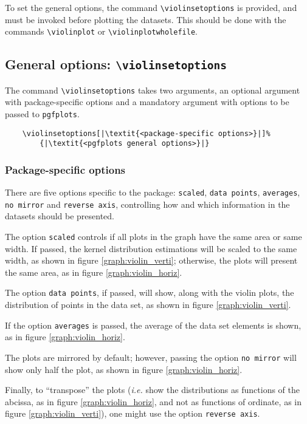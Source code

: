 \documentclass{article}
\begin{document}
To set the general options, the command \texttt{{\textbackslash}violinsetoptions}
is provided, and must be invoked before plotting the datasets. This should
be done with the commands \texttt{{\textbackslash}violinplot} or
\texttt{{\textbackslash}violinplotwholefile}.

\subsection{General options: \texttt{{\textbackslash}violinsetoptions}}

The command \texttt{{\textbackslash}violinsetoptions} takes two arguments,
an optional argument with package-specific options and a mandatory
argument with options to be passed to \texttt{pgfplots}.

\begin{verbatim}
	\violinsetoptions[|\textit{<package-specific options>}|]%
		{|\textit{<pgfplots general options>}|}
\end{verbatim}

\subsubsection{Package-specific options}

There are five options specific to the package: \texttt{scaled},
\texttt{data points}, \texttt{averages}, \texttt{no mirror} and
\texttt{reverse axis}, controlling how and which information
in the datasets should be presented.

The option \texttt{scaled} controls if all plots in the graph
have the same area or same width. If passed, the kernel
distribution estimations will be scaled to the same width, as
shown in figure \ref{graph:violin_verti}; otherwise, the plots
will present the same area, as in figure \ref{graph:violin_horiz}.

The option \texttt{data points}, if passed, will show, along with
the violin plots, the distribution of points in the data set, as shown in
figure \ref{graph:violin_verti}.

If the option \texttt{averages} is passed, the average of the data set
elements is shown, as in figure \ref{graph:violin_horiz}.

The plots are mirrored by default; however, passing the option \texttt{no mirror}
will show only half the plot, as shown in figure \ref{graph:violin_horiz}.

Finally, to ``transpose'' the plots (\textit{i.e.} show the distributions
as functions of the abcissa, as in figure \ref{graph:violin_horiz},
and not as functions of ordinate, as in figure \ref{graph:violin_verti}),
one might use the option \texttt{reverse axis}.
\end{document}
